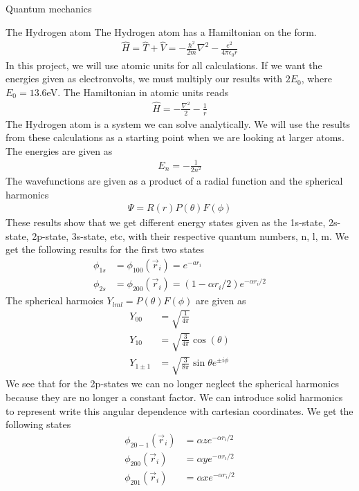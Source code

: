 \documentclass[a4paper, 12pt, titlepage]{article}
\begin{document}
\begin{section}{Quantum mechanics}
 \begin{subsection}{The Hydrogen atom}
 The Hydrogen atom has a Hamiltonian on the form. 
 \begin{align}
 	\hat H = \hat T + \hat V = -\frac{\hbar^2}{2m} \nabla^2 - \frac{e^2}{4 \pi \epsilon_0 r} 
 \end{align}
 In this project, we will use atomic units for all calculations. If we want the energies given as electronvolts, we must multiply our results with $2E_0$, where $E_0 = 13.6$eV. The Hamiltonian in atomic units reads
 \begin{align}
 	\hat H = -\frac{\nabla^2}{2} - \frac{1}{r}
 \end{align}
 The Hydrogen atom is a system we can solve analytically. We will use the results from these calculations as a starting point when we are looking at larger atoms. The energies are given as
 \begin{align}
 	E_n = -\frac{1}{2n^2}
 \end{align}
 The wavefunctions are given as a product of a radial function and the spherical harmonics 
 \begin{align}
 	\Psi = R(r)P(\theta)F(\phi)
 \end{align}
 These results show that we get different energy states given as the 1s-state, 2s-state, 2p-state, 3s-state, etc, with their respective quantum numbers, n, l, m. We get the following results for the first two states
 \begin{align}
 	\phi_{1s} &= \phi_{100}(\vec r_i) = e^{-ar_i} \\
 	\phi_{2s} &= \phi_{200}(\vec r_i) = (1 - \alpha r_i/2) e^{-\alpha r_i / 2} 
 \end{align}
 The spherical harmoics $Y_{l ml} = P(\theta)F(\phi)$ are given as
 \begin{align}
 	Y_{00} &= \sqrt{\frac{1}{4 \pi}} \\
 	Y_{10} &= \sqrt{\frac{3}{4 \pi}} \cos(\theta) \\
 	Y_{1\pm1} &= \sqrt{\frac{3}{8 \pi}}\sin{\theta} e^{\pm i \phi}
 \end{align}
 We see that for the 2p-states we can no longer neglect the spherical harmonics because they are no longer a constant factor. We can introduce solid harmonics to represent write this angular dependence with cartesian coordinates. We get the following states
 \begin{align}
 	\phi_{20-1}(\vec r_i) &= \alpha z e^{-\alpha r_i / 2} \\
 	\phi_{200}(\vec r_i) &= \alpha y e^{-\alpha r_i / 2} \\
 	\phi_{201}(\vec r_i) &= \alpha x e^{-\alpha r_i / 2} 
 \end{align}
 \end{subsection}


\end{section}
\end{document}
